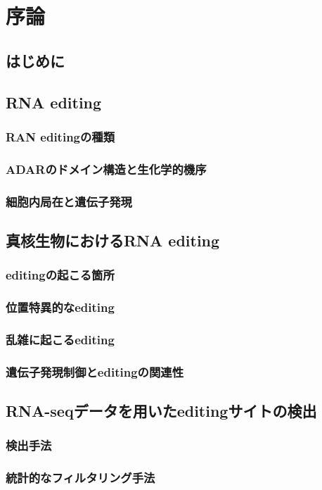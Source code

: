 \chapter{序論}
\section{はじめに}

\section{RNA editing}
\subsection{RAN editingの種類}
\subsection{ADARのドメイン構造と生化学的機序}
\subsection{細胞内局在と遺伝子発現}

\section{真核生物におけるRNA editing}
\subsection{editingの起こる箇所}
\subsection{位置特異的なediting}
\subsection{乱雑に起こるediting}
\subsection{遺伝子発現制御とeditingの関連性}

\section{RNA-seqデータを用いたeditingサイトの検出}
\subsection{検出手法}
\subsection{統計的なフィルタリング手法}



